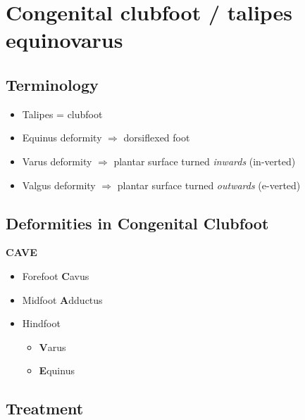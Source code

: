 \documentclass[
  12pt,
]{memoir}
\providecommand{\tightlist}{%
  \setlength{\itemsep}{0pt}\setlength{\parskip}{0pt}}
\begin{document}
\pagebreak

\hypertarget{congenital-clubfoot-talipes-equinovarus}{%
\section{Congenital clubfoot / talipes
equinovarus}\label{congenital-clubfoot-talipes-equinovarus}}

\hypertarget{terminology}{%
\subsection{Terminology}\label{terminology}}

\begin{itemize}
\tightlist
\item
  Talipes = clubfoot
\item
  Equinus deformity \(\Rightarrow\) dorsiflexed foot
\item
  Varus deformity \(\Rightarrow\) plantar surface turned \emph{inwards}
  (in-verted)
\item
  Valgus deformity \(\Rightarrow\) plantar surface turned
  \emph{outwards} (e-verted)
\end{itemize}

\hypertarget{deformities-in-congenital-clubfoot}{%
\subsection{Deformities in Congenital
Clubfoot}\label{deformities-in-congenital-clubfoot}}

\textbf{CAVE}

\begin{itemize}
\tightlist
\item
  Forefoot \textbf{C}avus
\item
  Midfoot \textbf{A}dductus
\item
  Hindfoot

  \begin{itemize}
  \tightlist
  \item
    \textbf{V}arus
  \item
    \textbf{E}quinus
  \end{itemize}
\end{itemize}

\hypertarget{treatment-1}{%
\subsection{Treatment}\label{treatment-1}}
\end{document}
